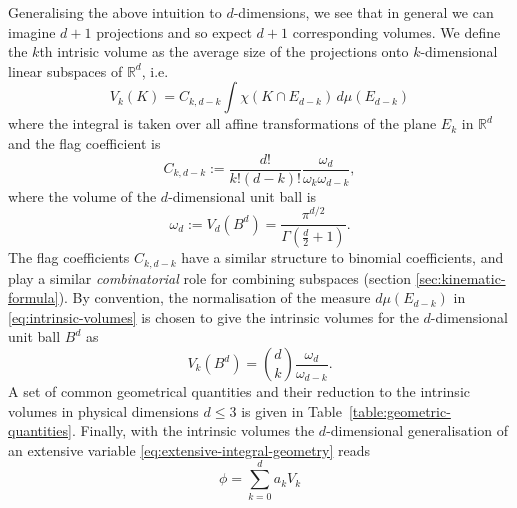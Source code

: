 Generalising the above intuition to $d$-dimensions, we see that in general we can imagine $d+1$ projections and so expect $d+1$ corresponding volumes.
We define the $k$th intrisic volume as the average size of the projections onto $k$-dimensional linear subspaces of $\mathbb{R}^d$, i.e.\
\begin{equation}\label{eq:intrinsic-volumes}
  V_k(K)
  =
  C_{k,d-k}
  \int \chi(K \cap E_{d-k}) \, d\mu(E_{d-k})
\end{equation}
where the integral is taken over all affine transformations of the plane $E_k$ in $\mathbb{R}^d$ and the flag coefficient is
\begin{equation}\label{eq:flag-coefficients}
  C_{k,d-k}
  :=
  \frac{d!}{k! (d-k)!} \frac{\omega_d}{\omega_k \omega_{d-k}},
\end{equation}
where the volume of the $d$-dimensional unit ball is
\begin{equation}
  \omega_d := V_d(B^d) = \frac{\pi^{d/2}}{\Gamma(\frac{d}{2} + 1)}.
\end{equation}
The flag coefficients $C_{k,d-k}$ have a similar structure to binomial coefficients, and play a similar \emph{combinatorial} role for combining subspaces (section \ref{sec:kinematic-formula}).
By convention, the normalisation of the measure $d\mu(E_{d-k})$ in \eqref{eq:intrinsic-volumes} is chosen to give the intrinsic volumes for the $d$-dimensional unit ball $B^d$ as
\begin{equation}\label{eq:intrinsic-volume-ball}
  V_k (B^d)
  =
  {d \choose k} \frac{\omega_d}{\omega_{d-k}}.
\end{equation}
A set of common geometrical quantities and their reduction to the intrinsic volumes in physical dimensions $d \le 3$ is given in Table~\ref{table:geometric-quantities}.
Finally, with the intrinsic volumes the $d$-dimensional generalisation of an extensive variable \eqref{eq:extensive-integral-geometry} reads
\begin{equation}\label{eq:extensive-integral-geometry-d}
  \phi = \sum_{k=0}^d a_k V_k
\end{equation}

